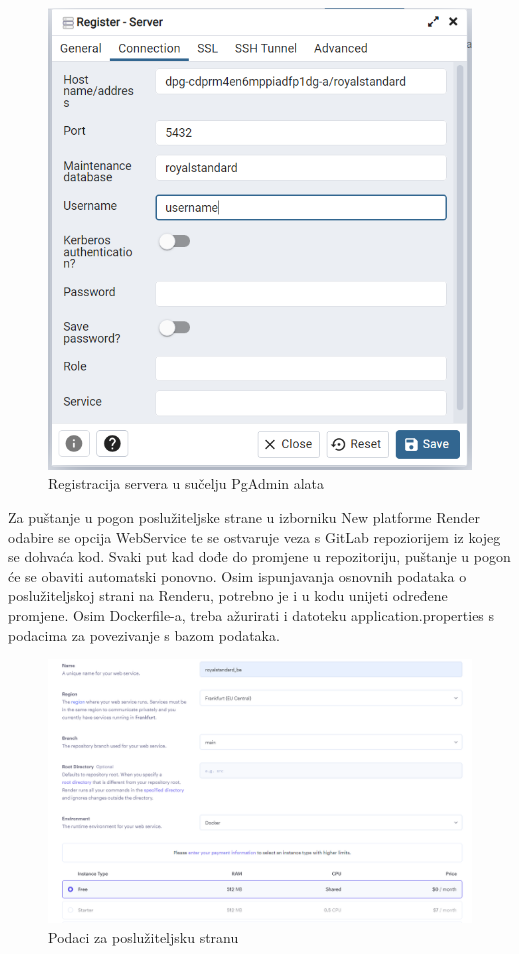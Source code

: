 		\begin{figure}[H]
			\includegraphics[width=\textwidth]{slike/registracijaservera.PNG} 
			\caption{Registracija servera u sučelju PgAdmin alata}
			\label{fig:Registracija servera baze podataka}
		\end{figure}
	
		
		Za puštanje u pogon poslužiteljske strane u izborniku New platforme Render odabire se opcija WebService te se ostvaruje veza s GitLab repoziorijem iz kojeg se dohvaća kod. Svaki put kad dođe do promjene u repozitoriju, puštanje u pogon će se obaviti automatski ponovno. Osim ispunjavanja osnovnih podataka o poslužiteljskoj strani na Renderu, potrebno je i u kodu unijeti određene promjene. Osim Dockerfile-a, treba ažurirati i datoteku application.properties s podacima za povezivanje s bazom podataka. 
		
		\begin{figure}[H]
			\includegraphics[width=\textwidth]{slike/osnovnipodacibackend.PNG} 
			\caption{Podaci za poslužiteljsku stranu}
			\label{fig:Podaci za poslužiteljsku stranu}
		\end{figure}
	

